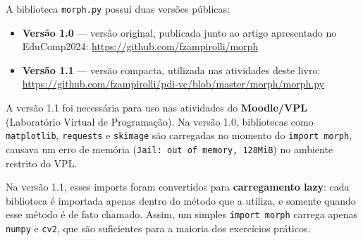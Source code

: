 \documentclass[
  portuguese,
  letterpaper,
  openany,
  oneside,
  12pt,
  a4paper]{book}
\begin{document}
\begin{tcolorbox}[enhanced jigsaw, coltitle=black, colback=white, colbacktitle=quarto-callout-note-color!10!white, bottomtitle=1mm, left=2mm, opacityback=0, breakable, rightrule=.15mm, titlerule=0mm, toptitle=1mm, opacitybacktitle=0.6, title=\textcolor{quarto-callout-note-color}{\faInfo}\hspace{0.5em}{Versões do \texttt{morph.py}}, colframe=quarto-callout-note-color-frame, arc=.35mm, bottomrule=.15mm, toprule=.15mm, leftrule=.75mm]

A biblioteca \texttt{morph.py} possui duas versões públicas:

\begin{itemize}
\item
  \textbf{Versão 1.0} --- versão original, publicada junto ao artigo
  apresentado no EduComp2024: \url{https://github.com/fzampirolli/morph}
\item
  \textbf{Versão 1.1} --- versão compacta, utilizada nas atividades
  deste livro:
  \url{https://github.com/fzampirolli/pdi-vc/blob/master/morph/morph.py}
\end{itemize}

A versão 1.1 foi necessária para uso nas atividades do
\textbf{Moodle/VPL} (Laboratório Virtual de Programação). Na versão 1.0,
bibliotecas como \texttt{matplotlib}, \texttt{requests} e
\texttt{skimage} são carregadas no momento do \texttt{import\ morph},
causava um erro de memória (\texttt{Jail:\ out\ of\ memory,\ 128MiB}) no
ambiente restrito do VPL.

Na versão 1.1, esses imports foram convertidos para \textbf{carregamento
lazy}: cada biblioteca é importada apenas dentro do método que a
utiliza, e somente quando esse método é de fato chamado. Assim, um
simples \texttt{import\ morph} carrega apenas \texttt{numpy} e
\texttt{cv2}, que são suficientes para a maioria dos exercícios
práticos.

\end{tcolorbox}
\end{document}
